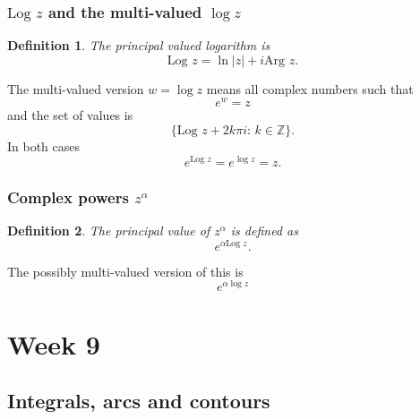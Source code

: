 \documentclass{article}
\newtheorem{definition}{Definition}
\begin{document}
\subsubsection{$\text{Log }z$ and the multi-valued $\log{z}$}
\begin{definition}
    The principal valued logarithm is
    \begin{equation}
        \text{Log }z = \ln{\vert z\vert} + i\text{Arg }{z}.
    \end{equation}
\end{definition}
The multi-valued version $w=\log{z}$ means all complex numbers such that
\begin{equation}
    e^w=z \nonumber
\end{equation}
and the set of values is
\begin{equation}
    \{ \text{Log }z + 2k\pi i:\, k\in\mathbb{Z} \}. \nonumber
\end{equation}
In both cases
\begin{equation}
    e^{\text{Log }z} = e^{\log{z}} = z. \nonumber
\end{equation}

\subsubsection{Complex powers $z^\alpha$}
\begin{definition}
    The principal value of $z^\alpha$ is defined as
    \begin{equation}
        e^{\alpha \text{Log }z}.
    \end{equation}
\end{definition}
The possibly multi-valued version of this is
\begin{equation}
    e^{\alpha \log{z}}
\end{equation}

\section{Week 9}
\subsection{Integrals, arcs and contours}
\end{document}
